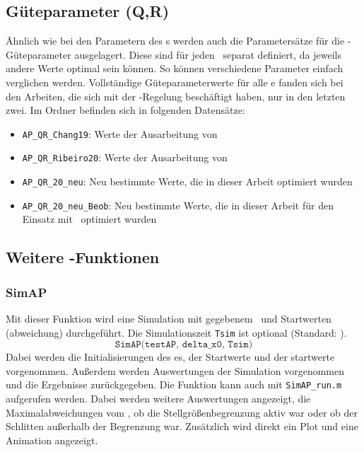 \subsection{Güteparameter (Q,R)}\label{subsec:simqr}

Ähnlich wie bei den Parametern des \spd s werden auch die Parametersätze für die \ricc-Güteparameter ausgelagert.
Diese sind für jeden \ap\ separat definiert, da jeweils andere Werte optimal sein können.
So können verschiedene Parameter einfach verglichen werden.
Vollständige Güteparameterwerte für alle \ap e fanden sich bei den Arbeiten, die sich mit der \ap-Regelung beschäftigt haben, nur in den letzten zwei.
Im Ordner  befinden sich in folgenden Datensätze:
\begin{itemize}
	\item \texttt{AP\_QR\_Chang19}: Werte der Ausarbeitung von \cite{chang}
	\item \texttt{AP\_QR\_Ribeiro20}: Werte der Ausarbeitung von \cite{ribeiro}
	\item \texttt{AP\_QR\_20\_neu}: Neu bestimmte Werte, die in dieser Arbeit optimiert wurden
	\item \texttt{AP\_QR\_20\_neu\_Beob}: Neu bestimmte Werte, die in dieser Arbeit für den Einsatz mit \beob\ optimiert wurden
\end{itemize}


\subsection{Weitere \Matlab-Funktionen}

\subsubsection{SimAP}
Mit dieser Funktion wird eine Simulation mit gegebenem \ap\ und Startwerten (\ap abweichung) durchgeführt. Die Simulationszeit \texttt{Tsim} ist optional (Standard: ).
\[
	\texttt{SimAP(testAP, delta\_x0, Tsim)}
\]
Dabei werden die Initialisierungen des \ap es, der Startwerte und der \beob startwerte vorgenommen.
Außerdem werden Auswertungen der Simulation vorgenommen  und die Ergebnisse zurückgegeben.
Die Funktion kann auch mit \texttt{SimAP\_run.m} aufgerufen werden. 
Dabei werden weitere Auswertungen angezeigt, \zB die Maximalabweichungen vom \ap, ob die Stellgrößenbegrenzung aktiv war oder ob der Schlitten außerhalb der Begrenzung war.
Zusätzlich wird direkt ein Plot und eine Animation  angezeigt.

